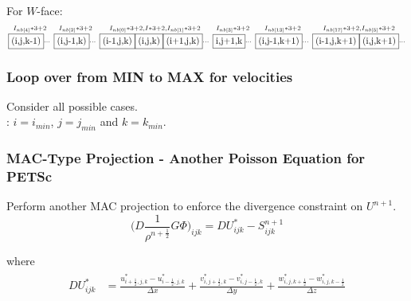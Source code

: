 \documentclass{article}
\numberwithin{equation}{subsection}
\begin{document}
For $W$-face:
\begin{equation}
\begin{smallmatrix}
I_{nb[4]}*3+2 & I_{nb[2]}*3+2 & I_{nb[0]}*3+2, I*3+2, I_{nb[1]}*3+2 & I_{nb[3]}*3+2 & I_{nb[13]}*3+2 & I_{nb[17]}*3+2,I_{nb[5]}*3+2 \\
\framebox{(i,j,k-1)}\cdots & \framebox{(i,j-1,k)}\cdots & \framebox{(i-1,j,k)}\framebox{(i,j,k)}\framebox{(i+1,j,k)}\cdots & \framebox{i,j+1,k}\cdots & \framebox{(i,j-1,k+1)}\cdots & \framebox{(i-1,j,k+1)}\framebox{(i,j,k+1)}\cdots \\
\end{smallmatrix}
\end{equation}




\subsubsection{Loop over from MIN to MAX for velocities}

Consider all possible cases.\\
: $i = i_{min}$, $j = j_{min}$ and $k = k_{min}$.\\






\subsubsection{MAC-Type Projection - Another Poisson Equation for PETSc}
Perform another MAC projection to enforce the divergence constraint on $U^{n+1}$.
\begin{equation}
\Big( D \frac{1}{\rho ^{n+\frac{1}{2}}} G \Phi \Big)_{ijk} = D U^{*}_{ijk} -S^{n+1}_{ijk}
\end{equation}

where
\begin{align}
\begin{split}
DU^{*}_{ijk} &= \frac{u^{*}_{i+\frac{1}{2},j,k} - u^{*}_{i-\frac{1}{2},j,k}}{\Delta x} + \frac{v^{*}_{i,j+\frac{1}{2},k} - v^{*}_{i,j-\frac{1}{2},k}}{\Delta y} + \frac{w^{*}_{i,j,k+\frac{1}{2}} - w^{*}_{i,j,k-\frac{1}{2}}}{\Delta z}
\end{split}
\end{align}
\end{document}
